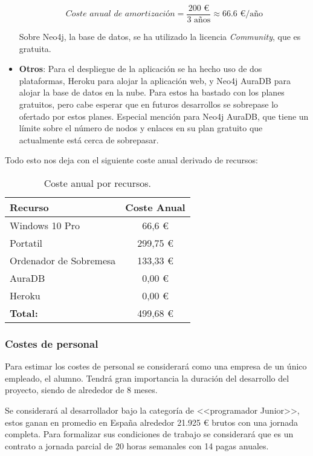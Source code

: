 \begin{itemize}
\[
\textit{Coste anual de amortización} = \frac{\text{200 €}}{\text{3 años}} \approx \text{66.6 €/año}
\]

Sobre Neo4j, la base de datos, se ha utilizado la licencia \textit{Community}, que es gratuita. 


\item \textbf{Otros}:
Para el despliegue de la aplicación se ha hecho uso de dos plataformas, Heroku para alojar la aplicación web, y Neo4j AuraDB para alojar la base de datos en la nube. Para estos ha bastado con los planes gratuitos, pero cabe esperar que en futuros desarrollos se sobrepase lo ofertado por estos planes. Especial mención para Neo4j AuraDB, que tiene un límite sobre el número de nodos y enlaces en su plan gratuito que actualmente está cerca de sobrepasar.


	
	
\end{itemize}

Todo esto nos deja con el siguiente coste anual derivado de recursos:

\begin{table}[h!]
	\centering
	\begin{tabular}{| l | c |}
		\toprule
		\textbf{Recurso} & \textbf{Coste Anual} \\ \midrule
		Windows 10 Pro & 66,6 €\\
		Portatil & 299,75 € \\
		Ordenador de Sobremesa & 133,33 €\\
		AuraDB & 0,00 €\\
		Heroku & 0,00 €\\
		\midrule
		\textbf{Total:} & 499,68 € \\
		\bottomrule
	\end{tabular}
	\caption{Coste anual por recursos.}
	\label{CostResources}
\end{table}

\subsubsection{Costes de personal}
Para estimar los costes de personal se considerará como una empresa de un único empleado, el alumno. Tendrá gran importancia la duración del desarrollo del proyecto, siendo de alrededor de 8 meses.

Se considerará al desarrollador bajo la categoría de <<programador Junior>>, estos ganan en promedio en España alrededor 21.925 € brutos con una jornada completa. Para formalizar sus condiciones de trabajo se considerará que es un contrato a jornada parcial de 20 horas semanales con 14 pagas anuales.

